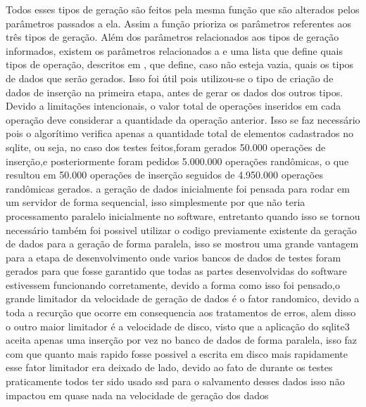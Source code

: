 \documentclass[
	12pt,				%
	openright,			%
	oneside,			%
	a4paper,			%
	english,			%
	french,				%
	spanish,			%
	brazil,				%
	]{abntex2}
\begin{document}
Todos esses tipos de geração são feitos pela mesma função que são alterados pelos parâmetros passados a ela.
Assim a função prioriza os parâmetros referentes aos três tipos de geração.\newline
Além dos parâmetros relacionados aos tipos de geração informados, existem os parâmetros relacionados a  e uma lista que define quais tipos de operação,
descritos em , que define, caso não esteja vazia,
quais os tipos de dados que serão gerados. Isso foi útil pois utilizou-se o tipo de criação de dados de inserção na primeira etapa, antes de gerar os dados dos outros tipos.\newline
Devido a limitações intencionais, o valor total de operações inseridos em cada operação deve considerar a quantidade da operação anterior.
Isso se faz necessário pois o algorítimo verifica apenas a quantidade total de elementos cadastrados no sqlite,
ou seja, no caso dos testes feitos,foram gerados 50.000 operações de inserção,e posteriormente foram pedidos 5.000.000 operações randômicas,
o que resultou em 50.000 operações de inserção seguidos de 4.950.000 operações randômicas gerados.
a geração de dados inicialmente foi pensada para rodar em um servidor de forma sequencial,
isso simplesmente por que não teria processamento paralelo inicialmente no software,
entretanto quando isso se tornou necessário também foi possivel utilizar o codigo previamente existente da geração de dados para a geração de forma paralela,
isso se mostrou uma grande vantagem para a etapa de desenvolvimento onde varios bancos de dados de testes foram gerados para que fosse garantido que todas as partes desenvolvidas do software estivessem funcionando corretamente,
devido a forma como isso foi pensado,o grande limitador da velocidade de geração de dados é o fator randomico,
devido a toda a recurção que ocorre em consequencia aos tratamentos de erros,
alem disso o outro maior limitador é a velocidade de disco,
visto que a aplicação do sqlite3 aceita apenas uma inserção por vez no banco de dados de forma paralela,
isso faz com que quanto mais rapido fosse possivel a escrita em disco mais rapidamente esse fator limitador era deixado de lado,
devido ao fato de durante os testes praticamente todos ter sido usado ssd para o salvamento desses dados isso não impactou em quase nada na velocidade de geração dos dados
\end{document}
